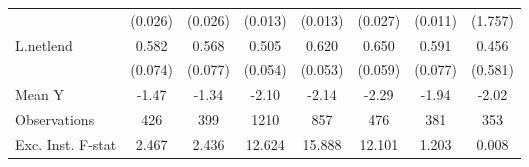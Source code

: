 {\begin{tabular}{l*{7}{c}}
            &     (0.026)         &     (0.026)         &     (0.013)         &     (0.013)         &     (0.027)         &     (0.011)         &     (1.757)         \\
\addlinespace
L.netlend   &       0.582\sym{***}&       0.568\sym{***}&       0.505\sym{***}&       0.620\sym{***}&       0.650\sym{***}&       0.591\sym{***}&       0.456         \\
            &     (0.074)         &     (0.077)         &     (0.054)         &     (0.053)         &     (0.059)         &     (0.077)         &     (0.581)         \\
\midrule
Mean Y      &       -1.47         &       -1.34         &       -2.10         &       -2.14         &       -2.29         &       -1.94         &       -2.02         \\
Observations&         426         &         399         &        1210         &         857         &         476         &         381         &         353         \\
Exc. Inst. F-stat&       2.467         &       2.436         &      12.624         &      15.888         &      12.101         &       1.203         &       0.008         \\
\bottomrule
\end{tabular}
}
